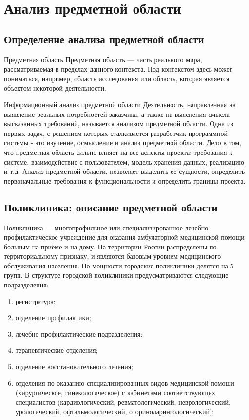 \documentclass[14pt,a4paper,russian]{extreport}
\begin{document}
\addtocounter{page}{1}


\tableofcontents{}

\newpage

\sloppy

\chapter{Анализ предметной области}

\section{Определение анализа предметной области}

Предметная область
Предметная область — часть реального мира, рассматриваемая в пределах данного контекста. Под
контекстом здесь может пониматься, например, область исследования или область, которая является
объектом некоторой деятельности.\cite{domainknowladge}

Информационный анализ предметной области
Деятельность, направленная на выявление реальных потребностей заказчика, а также на выяснения
смысла высказанных требований, называется анализом предметной области.
Одна из первых задач, с решением которых сталкивается разработчик программной системы - это
изучение, осмысление и анализ предметной области. Дело в том, что предметная область сильно влияет
на все аспекты проекта: требования к системе, взаимодействие с пользователем, модель хранения
данных, реализацию и т.д.  Анализ предметной области, позволяет выделить ее сущности, определить
первоначальные требования к функциональности и определить границы проекта.


\section{Поликлиника: описание предметной области}
Поликлиника — многопрофильное или специализированное лечебно-профилактическое учреждение для
оказания амбулаторной медицинской помощи больным на приёме и на дому.  На территории России
распределены по территориальному признаку, и являются базовым уровнем медицинского обслуживания
населения.  По мощности городские поликлиники делятся на 5 групп. В структуре городской поликлиники
предусматриваются следующие подразделения:

\begin{enumerate}[noitemsep]
    \item регистратура;
    \item отделение профилактики;
    \item лечебно-профилактические подразделения:
    \item терапевтические отделения;
    \item отделение восстановительного лечения;
    \item отделения по оказанию специализированных видов медицинской помощи (хирургическое,
        гинекологическое) с кабинетами соответствующих специалистов (кардиологический,
        ревматологический, неврологический, урологический, офтальмологический,
        оториноларингологический);
\end{enumerate}
\end{document}
